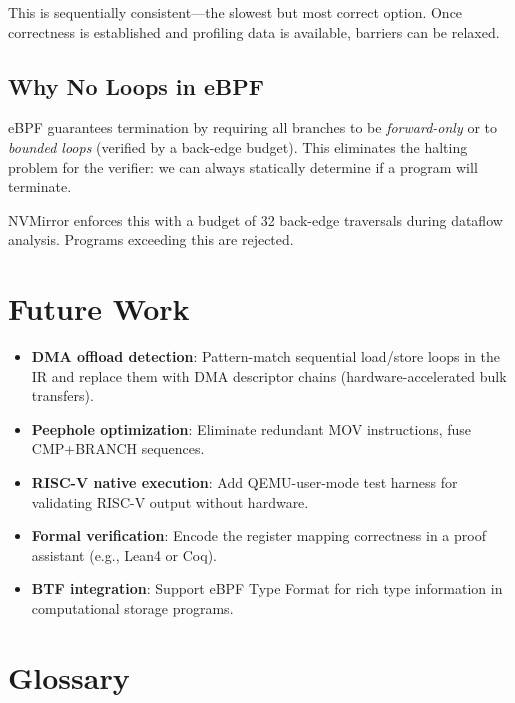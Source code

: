\documentclass[11pt,letterpaper]{article}
\begin{document}
This is sequentially consistent---the slowest but most correct option. Once correctness is established and profiling data is available, barriers can be relaxed.

\subsection{Why No Loops in eBPF}

eBPF guarantees termination by requiring all branches to be \emph{forward-only} or to \emph{bounded loops} (verified by a back-edge budget). This eliminates the halting problem for the verifier: we can always statically determine if a program will terminate.

NVMirror enforces this with a budget of 32 back-edge traversals during dataflow analysis. Programs exceeding this are rejected.

\section{Future Work}

\begin{itemize}
    \item \textbf{DMA offload detection}: Pattern-match sequential load/store loops in the IR and replace them with DMA descriptor chains (hardware-accelerated bulk transfers).
    \item \textbf{Peephole optimization}: Eliminate redundant MOV instructions, fuse CMP+BRANCH sequences.
    \item \textbf{RISC-V native execution}: Add QEMU-user-mode test harness for validating RISC-V output without hardware.
    \item \textbf{Formal verification}: Encode the register mapping correctness in a proof assistant (e.g., Lean4 or Coq).
    \item \textbf{BTF integration}: Support eBPF Type Format for rich type information in computational storage programs.
\end{itemize}

\section{Glossary}
\end{document}
